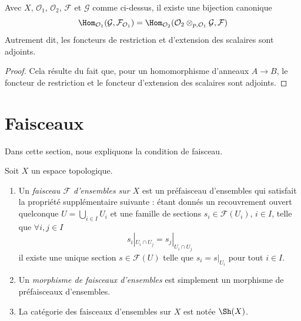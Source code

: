 \begin{lemma}
\label{lemma-adjointness-tensor-restrict-presheaves}
Avec $X$, $\mathcal{O}_1$, $\mathcal{O}_2$, $\mathcal{F}$ et
$\mathcal{G}$ comme ci-dessus, il existe une bijection canonique
$$
\Hom_{\mathcal{O}_1}(\mathcal{G}, \mathcal{F}_{\mathcal{O}_1})
=
\Hom_{\mathcal{O}_2}(
\mathcal{O}_2 \otimes_{p, \mathcal{O}_1} \mathcal{G},
\mathcal{F}
)
$$
Autrement dit, les foncteurs de restriction et d'extension des scalaires
sont adjoints.
\end{lemma}

\begin{proof}
Cela résulte du fait que, pour un homomorphisme d'anneaux
$A \to B$, le foncteur de restriction et le foncteur
d'extension des scalaires sont adjoints.
\end{proof}





\section{Faisceaux}
\label{section-sheaves}

\noindent
Dans cette section, nous expliquons la condition de faisceau.

\begin{definition}
\label{definition-sheaf}
Soit $X$ un espace topologique.
\begin{enumerate}
\item Un {\it faisceau $\mathcal{F}$ d'ensembles sur $X$} est un préfaisceau
d'ensembles qui satisfait la propriété supplémentaire suivante : étant donnés
un recouvrement ouvert quelconque $U = \bigcup_{i \in I} U_i$ et une famille
de sections $s_i \in \mathcal{F}(U_i)$, $i \in I$, telle que
$\forall i, j\in I$
$$
s_i|_{U_i \cap U_j} = s_j|_{U_i \cap U_j}
$$
il existe une unique section $s \in \mathcal{F}(U)$ telle que
$s_i = s|_{U_i}$ pour tout $i \in I$.
\item Un {\it morphisme de faisceaux d'ensembles} est simplement un
morphisme de préfaisceaux d'ensembles.
\item La catégorie des faisceaux d'ensembles sur $X$ est notée
$\Sh(X)$.
\end{enumerate}
\end{definition}

